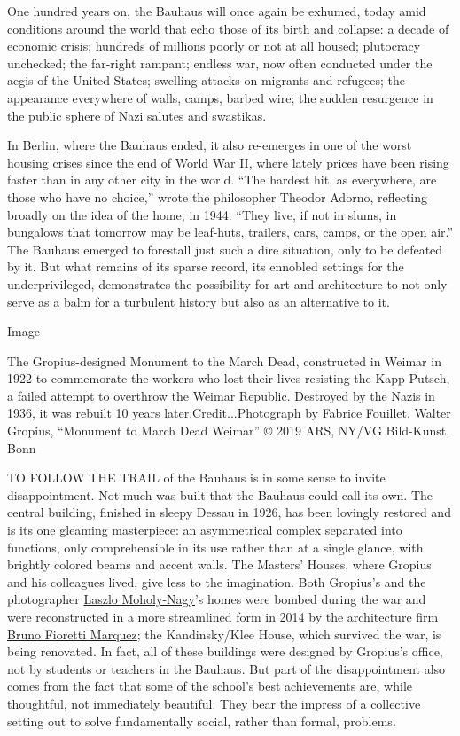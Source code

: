 One hundred years on, the Bauhaus will once again be exhumed, today amid
conditions around the world that echo those of its birth and collapse: a
decade of economic crisis; hundreds of millions poorly or not at all
housed; plutocracy unchecked; the far-right rampant; endless war, now
often conducted under the aegis of the United States; swelling attacks
on migrants and refugees; the appearance everywhere of walls, camps,
barbed wire; the sudden resurgence in the public sphere of Nazi salutes
and swastikas.

In Berlin, where the Bauhaus ended, it also re-emerges in one of the
worst housing crises since the end of World War II, where lately prices
have been rising faster than in any other city in the world. ``The
hardest hit, as everywhere, are those who have no choice,'' wrote the
philosopher Theodor Adorno, reflecting broadly on the idea of the home,
in 1944. ``They live, if not in slums, in bungalows that tomorrow may be
leaf-huts, trailers, cars, camps, or the open air.'' The Bauhaus emerged
to forestall just such a dire situation, only to be defeated by it. But
what remains of its sparse record, its ennobled settings for the
underprivileged, demonstrates the possibility for art and architecture
to not only serve as a balm for a turbulent history but also as an
alternative to it.

Image

The Gropius-designed Monument to the March Dead, constructed in Weimar
in 1922 to commemorate the workers who lost their lives resisting the
Kapp Putsch, a failed attempt to overthrow the Weimar Republic.
Destroyed by the Nazis in 1936, it was rebuilt 10 years
later.Credit...Photograph by Fabrice Fouillet. Walter Gropius,
``Monument to March Dead Weimar'' © 2019 ARS, NY/VG Bild-Kunst, Bonn

TO FOLLOW THE TRAIL of the Bauhaus is in some sense to invite
disappointment. Not much was built that the Bauhaus could call its own.
The central building, finished in sleepy Dessau in 1926, has been
lovingly restored and is its one gleaming masterpiece: an asymmetrical
complex separated into functions, only comprehensible in its use rather
than at a single glance, with brightly colored beams and accent walls.
The Masters' Houses, where Gropius and his colleagues lived, give less
to the imagination. Both Gropius's and the photographer
\href{https://www.nytimes3xbfgragh.onion/2016/05/27/arts/design/moholy-nagy-future-present-vision-and-precision-in-a-fluid-braid.html}{Laszlo
Moholy-Nagy}'s homes were bombed during the war and were reconstructed
in a more streamlined form in 2014 by the architecture firm
\href{https://bfm.berlin/}{Bruno Fioretti Marquez}; the Kandinsky/Klee
House, which survived the war, is being renovated. In fact, all of these
buildings were designed by Gropius's office, not by students or teachers
in the Bauhaus. But part of the disappointment also comes from the fact
that some of the school's best achievements are, while thoughtful, not
immediately beautiful. They bear the impress of a collective setting out
to solve fundamentally social, rather than formal, problems.

